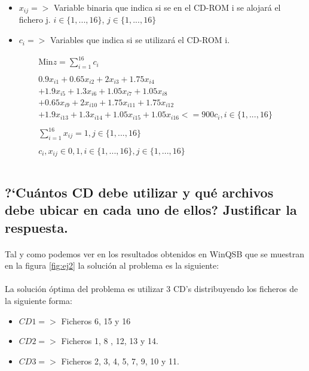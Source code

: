 \documentclass[10pt, a4paper]{article}
\begin{document}
			\begin{itemize}

				\item \(x_{ij} => \) Variable binaria que indica si se en el CD-ROM i se alojará el fichero j.  $i \in \{1,...,16\}$, $j \in \{1,...,16\}$

				\item \(c_{i} => \) Variables que indica si se utilizará el CD-ROM i.
			\end{itemize}
			\[
				\begin{split}
					\text{Min} z = \sum_{i=1}^{16} c_{i} \\ \\
						0.9x_{i1} + 0.65x_{i2} + 2x_{i3} + 1.75x_{i4} \\
						+ 1.9x_{i5} + 1.3x_{i6} + 1.05 x_{i7} + 1.05 x_{i8} \\
						+ 0.65x_{i9} + 2x_{i10} + 1.75x_{i11}  + 1.75x_{i12}\\
						+ 1.9x_{i13} + 1.3x_{i14} + 1.05 x_{i15} + 1.05 x_{i16} <= 900c_{i}, i \in \{1,...,16\}\\ \\
					 	\sum_{i=1}^{16} x_{ij} = 1, j \in \{1,...,16\}\\ \\
						c_{i}, x_{ij} \in {0,1}, i \in \{1,...,16\},j \in \{1,...,16\}\\ \\
				\end{split}
			\]
		\subsection{?`Cuántos CD debe utilizar y qué archivos debe ubicar en cada uno de ellos? Justificar la respuesta.}

			\paragraph{}
			Tal y como podemos ver en los resultados obtenidos en WinQSB que se muestran en la figura \ref{fig:ej2} la solución al problema es la siguiente:

			\paragraph{}
			La solución óptima del problema es utilizar 3 CD's distribuyendo los ficheros de la siguiente forma:

			\begin{itemize}

				\item \(CD1 =>\) Ficheros 6, 15 y 16

				\item \(CD2 =>\) Ficheros 1, 8 , 12, 13 y 14.

				\item \(CD3 =>\) Ficheros 2, 3, 4, 5, 7, 9, 10 y 11.
			\end{itemize}
\end{document}
